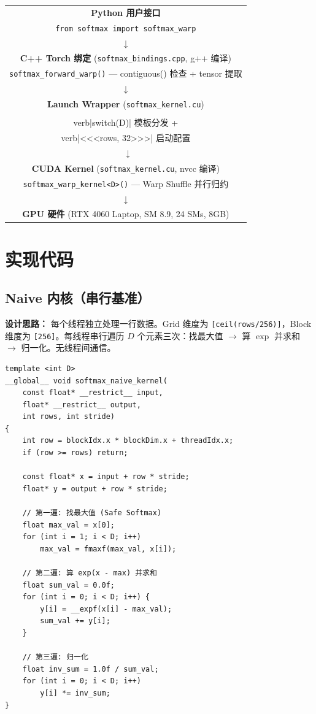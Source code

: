 \documentclass[12pt,a4paper]{ctexart}
\begin{document}
\begin{center}
\begin{tabular}{c}
\textbf{Python 用户接口} \\
\verb|from softmax import softmax_warp| \\
$\downarrow$ \\[4pt]
\textbf{C++ Torch 绑定} (\verb|softmax_bindings.cpp|, g++ 编译) \\
\verb|softmax_forward_warp()| — contiguous() 检查 + tensor 提取 \\
$\downarrow$ \\[4pt]
\textbf{Launch Wrapper} (\verb|softmax_kernel.cu|) \\
\\verb|switch(D)| 模板分发 + \\verb|<<<rows, 32>>>| 启动配置 \\\
$\downarrow$ \\[4pt]
\textbf{CUDA Kernel} (\verb|softmax_kernel.cu|, nvcc 编译) \\
\verb|softmax_warp_kernel<D>()| — Warp Shuffle 并行归约 \\
$\downarrow$ \\[4pt]
\textbf{GPU 硬件} (RTX 4060 Laptop, SM 8.9, 24 SMs, 8GB)
\end{tabular}
\end{center}

\section{实现代码}

\subsection{Naive 内核（串行基准）}

\textbf{设计思路：} 每个线程独立处理一行数据。Grid 维度为 \texttt{[ceil(rows/256)]}，Block 维度为 \texttt{[256]}。每线程串行遍历 $D$ 个元素三次：找最大值 $\to$ 算 $\exp$ 并求和 $\to$ 归一化。无线程间通信。

\begin{lstlisting}[style=cuda, caption={Naive Softmax 内核}, label=lst:naive]
template <int D>
__global__ void softmax_naive_kernel(
    const float* __restrict__ input,
    float* __restrict__ output,
    int rows, int stride)
{
    int row = blockIdx.x * blockDim.x + threadIdx.x;
    if (row >= rows) return;

    const float* x = input + row * stride;
    float* y = output + row * stride;

    // 第一遍: 找最大值 (Safe Softmax)
    float max_val = x[0];
    for (int i = 1; i < D; i++)
        max_val = fmaxf(max_val, x[i]);

    // 第二遍: 算 exp(x - max) 并求和
    float sum_val = 0.0f;
    for (int i = 0; i < D; i++) {
        y[i] = __expf(x[i] - max_val);
        sum_val += y[i];
    }

    // 第三遍: 归一化
    float inv_sum = 1.0f / sum_val;
    for (int i = 0; i < D; i++)
        y[i] *= inv_sum;
}
\end{lstlisting}
\end{document}
